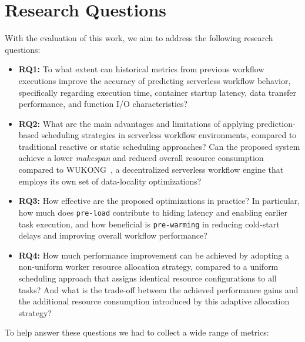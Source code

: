 \section{Research Questions}

With the evaluation of this work, we aim to address the following research questions:

\begin{itemize}
\item \textbf{RQ1:} To what extent can historical metrics from previous workflow executions improve the accuracy of predicting serverless workflow behavior, specifically regarding execution time, container startup latency, data transfer performance, and function I/O characteristics?

\item \textbf{RQ2:} What are the main advantages and limitations of applying prediction-based scheduling strategies in serverless workflow environments, compared to traditional reactive or static scheduling approaches? Can the proposed system achieve a lower \textit{makespan} and reduced overall resource consumption compared to WUKONG~\cite{wukong_2}, a decentralized serverless workflow engine that employs its own set of data-locality optimizations?

\item \textbf{RQ3:} How effective are the proposed optimizations in practice? In particular, how much does \texttt{pre-load} contribute to hiding latency and enabling earlier task execution, and how beneficial is \texttt{pre-warming} in reducing cold-start delays and improving overall workflow performance?

\item \textbf{RQ4:} How much performance improvement can be achieved by adopting a non-uniform worker resource allocation strategy, compared to a uniform scheduling approach that assigns identical resource configurations to all tasks? And what is the trade-off between the achieved performance gains and the additional resource consumption introduced by this adaptive allocation strategy?
\end{itemize}

To help answer these questions we had to collect a wide range of metrics:

